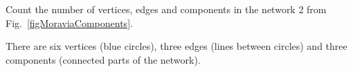 Count the number of vertices, edges and components in the network 2 from Fig.~\ref{figMoraviaComponents}. 

\solution
There are six vertices (blue circles), three edges (lines between circles) and three components (connected parts of the network). 


